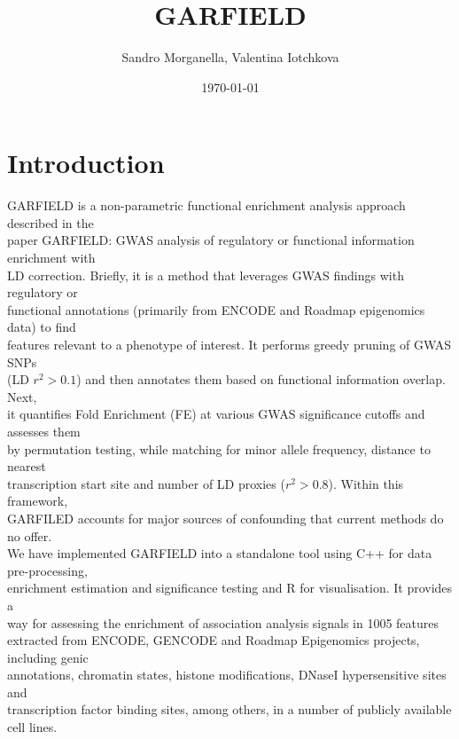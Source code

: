 \documentclass[a4paper]{article}\usepackage[]{graphicx}\usepackage[]{color}
\begin{document}
\title{GARFIELD}
\author{Sandro Morganella, Valentina Iotchkova}
\date\today
\maketitle
\section{Introduction}
GARFIELD is a non-parametric functional enrichment analysis approach described in the\\
paper GARFIELD: GWAS analysis of regulatory or functional information enrichment with\\
LD correction. Briefly, it is a method that leverages GWAS findings with regulatory or\\
functional annotations (primarily from ENCODE and Roadmap epigenomics data) to find\\
features relevant to a phenotype of interest. It performs greedy pruning of GWAS SNPs\\
(LD $r^2 > 0.1$) and then annotates them based on functional information overlap. Next,\\
it quantifies Fold Enrichment (FE) at various GWAS significance cutoffs and assesses them\\
by permutation testing, while matching for minor allele frequency, distance to nearest\\
transcription start site and number of LD proxies ($r^2 > 0.8$). Within this framework,\\
GARFILED accounts for major sources of confounding that current methods do no offer.\\

We have implemented GARFIELD into a standalone tool using C++ for data pre-processing,\\
enrichment estimation and significance testing and R for visualisation. It provides a\\
way for assessing the enrichment of association analysis signals in 1005 features\\
extracted from ENCODE, GENCODE and Roadmap Epigenomics projects, including genic\\
annotations, chromatin states, histone modifications, DNaseI hypersensitive sites and\\
transcription factor binding sites, among others, in a number of publicly available\\
cell lines. 
\end{document}
